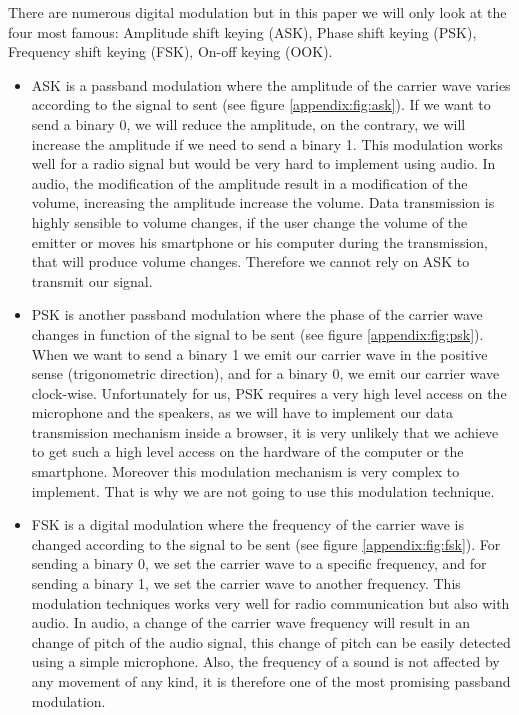 \documentclass[twocolumn,14pt]{extarticle}
\begin{document}
There are numerous digital modulation but in this paper we will only look at the four most famous: Amplitude shift keying (ASK), Phase shift keying (PSK), Frequency shift keying (FSK), On-off keying (OOK).
\begin{itemize}
\item ASK is a passband modulation where the amplitude of the carrier wave varies according to the signal to sent (see figure \ref{appendix:fig:ask}). If we want to send a binary 0, we will reduce the amplitude, on the contrary, we will increase the amplitude if we need to send a binary 1. This modulation works well for a radio signal but would be very hard to implement using audio. In audio, the modification of the amplitude result in a modification of the volume, increasing the amplitude increase the volume. Data transmission is highly sensible to volume changes, if the user change the volume of the emitter or moves his smartphone or his computer during the transmission, that will produce volume changes. Therefore we cannot rely on ASK to transmit our signal.
\item PSK is another passband modulation where the phase of the carrier wave changes in function of the signal to be sent (see figure \ref{appendix:fig:psk}). When we want to send a binary 1 we emit our carrier wave in the positive sense (trigonometric direction), and for a binary 0, we emit our carrier wave clock-wise. Unfortunately for us, PSK requires a very high level access on the microphone and the speakers, as we will have to implement our data transmission mechanism inside a browser, it is very unlikely that we achieve to get such a high level access on the hardware of the computer or the smartphone. Moreover this modulation mechanism is very complex to implement. That is why we are not going to use this modulation technique.
\item FSK is a digital modulation where the frequency of the carrier wave is changed according to the signal to be sent (see figure \ref{appendix:fig:fsk}). For sending a binary 0, we set the carrier wave to a specific frequency, and for sending a binary 1, we set the carrier wave to another frequency. This modulation techniques works very well for radio communication but also with audio. In audio, a change of the carrier wave frequency will result in an change of pitch of the audio signal, this change of pitch can be easily detected using a simple microphone. Also, the frequency of a sound is not affected by any movement of any kind, it is therefore one of the most promising passband modulation.

\end{itemize}
\end{document}
